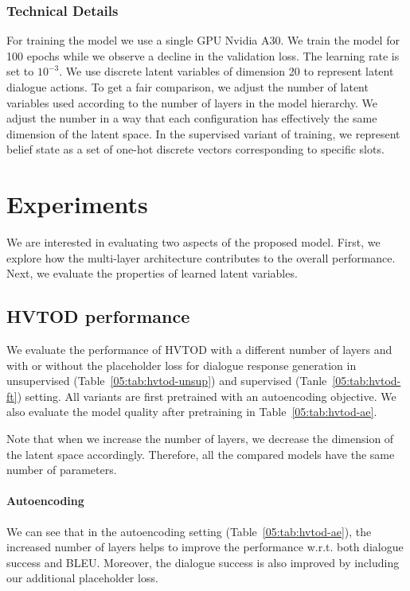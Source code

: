 \subsubsection{Technical Details}
For training the model we use a single GPU Nvidia A30.
We train the model for 100 epochs while we observe a decline in the validation loss.
The learning rate is set to $10^{-3}$.
We use discrete latent variables of dimension 20 to represent latent dialogue actions.
To get a fair comparison, we adjust the number of latent variables used according to the number of layers in the model hierarchy.
We adjust the number in a way that each configuration has effectively the same dimension of the latent space.
In the supervised variant of training, we represent belief state as a set of one-hot discrete vectors corresponding to specific slots.

\section{Experiments}
We are interested in evaluating two aspects of the proposed model.
First, we explore how the multi-layer architecture contributes to the overall performance.
Next, we evaluate the properties of learned latent variables.

\subsection{HVTOD performance}
We evaluate the performance of HVTOD with a different number of layers and with or without the placeholder loss for dialogue response generation in unsupervised (Table~\ref{05:tab:hvtod-unsup}) and supervised (Tanle~\ref{05:tab:hvtod-ft}) setting.
All variants are first pretrained with an autoencoding objective.
We also evaluate the model quality after pretraining in Table~\ref{05:tab:hvtod-ae}.

Note that when we increase the number of layers, we decrease the dimension of the latent space accordingly.
Therefore, all the compared models have the same number of parameters.

\paragraph{Autoencoding}
We can see that in the autoencoding setting (Table~\ref{05:tab:hvtod-ae}), the increased number of layers helps to improve the performance w.r.t. both dialogue success and BLEU.
Moreover, the dialogue success is also improved by including our additional placeholder loss.


